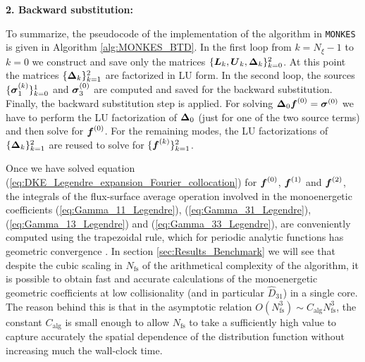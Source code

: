 \documentclass[10pt]{iopart}
\newcommand{\MONKES}{{\texttt{MONKES}}}
\begin{document}
\begin{algorithm}
\begin{algorithmic}
		\EndFor
		
		
		
		\State{}
	\end{algorithmic}
	
	\textbf{2. Backward substitution:}
	\begin{algorithmic}%
		\EndFor
	\end{algorithmic}
\end{algorithm}


To summarize, the pseudocode of the implementation of the algorithm in {\MONKES} is given in Algorithm \ref{alg:MONKES_BTD}. In the first loop from $k=N_\xi-1$ to $k=0$ we construct and save only the matrices $\{\vb*{L}_k,\vb*{U}_k, \vb*{\Delta}_k\}_{k=0}^{2}$. At this point the matrices $\{\vb*{\Delta}_k\}_{k=1}^{2}$ are factorized in LU form. In the second loop, the sources $\{\vb*{\sigma}_1^{(k)}\}_{k=0}^{1}$ and $\vb*{\sigma}_3^{(0)}$ are computed and saved for the backward substitution. Finally, the backward substitution step is applied. For solving $\vb*{\Delta}_0 \vb*{f}^{(0)} = \vb*{\sigma}^{(0)}$ we have to perform the LU factorization of $\vb*{\Delta}_0$ (just for one of the two source terms) and then solve for $\vb*{f}^{(0)}$. For the remaining modes, the LU factorizations of $\{\vb*{\Delta}_k\}_{k=1}^{2}$ are reused to solve for $\{\vb*{f}^{(k)}\}_{k=1}^{2}$.

Once we have solved equation (\ref{eq:DKE_Legendre_expansion_Fourier_collocation}) for $\vb*{f}^{(0)}$, $\vb*{f}^{(1)}$ and $\vb*{f}^{(2)}$, the integrals of the flux-surface average operation involved in the monoenergetic coefficients (\ref{eq:Gamma_11_Legendre}), (\ref{eq:Gamma_31_Legendre}), (\ref{eq:Gamma_13_Legendre}) and (\ref{eq:Gamma_33_Legendre}), are conveniently computed using the trapezoidal rule, which for periodic analytic functions has geometric convergence \cite{Trapezoidal}. In section \ref{sec:Results_Benchmark} we will see that despite the cubic scaling in $N_{\text{fs}}$ of the arithmetical complexity of the algorithm, it is possible to obtain fast and accurate calculations of the monoenergetic geometric coefficients at low collisionality (and in particular $\widehat{D}_{31}$) in a single core. The reason behind this is that in the asymptotic relation $O(N_{\text{fs}}^3)\sim C_{\text{alg}} N_{\text{fs}}^3$, the constant $C_{\text{alg}}$ is small enough to allow $N_{\text{fs}}$ to take a sufficiently high value to capture accurately the spatial dependence of the distribution function without increasing much the wall-clock time. 
\end{document}

